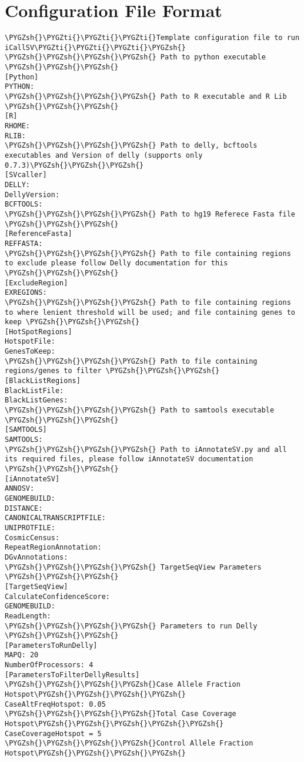 \documentclass[letterpaper,10pt,english]{sphinxmanual}
\def\PYGZsh{\char`\#}
\def\PYGZti{\char`\~}
\begin{document}
\section{Configuration File Format}
\label{iCallSV:configuration-file-format}
\begin{Verbatim}[commandchars=\\\{\}]
\PYGZsh{}\PYGZti{}\PYGZti{}\PYGZti{}Template configuration file to run iCallSV\PYGZti{}\PYGZti{}\PYGZti{}\PYGZsh{}
\PYGZsh{}\PYGZsh{}\PYGZsh{}\PYGZsh{} Path to python executable \PYGZsh{}\PYGZsh{}\PYGZsh{}
[Python]
PYTHON:
\PYGZsh{}\PYGZsh{}\PYGZsh{}\PYGZsh{} Path to R executable and R Lib \PYGZsh{}\PYGZsh{}\PYGZsh{}
[R]
RHOME:
RLIB:
\PYGZsh{}\PYGZsh{}\PYGZsh{}\PYGZsh{} Path to delly, bcftools executables and Version of delly (supports only 0.7.3)\PYGZsh{}\PYGZsh{}\PYGZsh{}
[SVcaller]
DELLY:
DellyVersion:
BCFTOOLS:
\PYGZsh{}\PYGZsh{}\PYGZsh{}\PYGZsh{} Path to hg19 Referece Fasta file \PYGZsh{}\PYGZsh{}\PYGZsh{}
[ReferenceFasta]
REFFASTA:
\PYGZsh{}\PYGZsh{}\PYGZsh{}\PYGZsh{} Path to file containing regions to exclude please follow Delly documentation for this \PYGZsh{}\PYGZsh{}\PYGZsh{}
[ExcludeRegion]
EXREGIONS:
\PYGZsh{}\PYGZsh{}\PYGZsh{}\PYGZsh{} Path to file containing regions to where lenient threshold will be used; and file containing genes to keep \PYGZsh{}\PYGZsh{}\PYGZsh{}
[HotSpotRegions]
HotspotFile:
GenesToKeep:
\PYGZsh{}\PYGZsh{}\PYGZsh{}\PYGZsh{} Path to file containing regions/genes to filter \PYGZsh{}\PYGZsh{}\PYGZsh{}
[BlackListRegions]
BlackListFile:
BlackListGenes:
\PYGZsh{}\PYGZsh{}\PYGZsh{}\PYGZsh{} Path to samtools executable \PYGZsh{}\PYGZsh{}\PYGZsh{}
[SAMTOOLS]
SAMTOOLS:
\PYGZsh{}\PYGZsh{}\PYGZsh{}\PYGZsh{} Path to iAnnotateSV.py and all its required files, please follow iAnnotateSV documentation \PYGZsh{}\PYGZsh{}\PYGZsh{}
[iAnnotateSV]
ANNOSV:
GENOMEBUILD:
DISTANCE:
CANONICALTRANSCRIPTFILE:
UNIPROTFILE:
CosmicCensus:
RepeatRegionAnnotation:
DGvAnnotations:
\PYGZsh{}\PYGZsh{}\PYGZsh{}\PYGZsh{} TargetSeqView Parameters \PYGZsh{}\PYGZsh{}\PYGZsh{}
[TargetSeqView]
CalculateConfidenceScore:
GENOMEBUILD:
ReadLength:
\PYGZsh{}\PYGZsh{}\PYGZsh{}\PYGZsh{} Parameters to run Delly \PYGZsh{}\PYGZsh{}\PYGZsh{}
[ParametersToRunDelly]
MAPQ: 20
NumberOfProcessors: 4
[ParametersToFilterDellyResults]
\PYGZsh{}\PYGZsh{}\PYGZsh{}\PYGZsh{}Case Allele Fraction Hotspot\PYGZsh{}\PYGZsh{}\PYGZsh{}\PYGZsh{}
CaseAltFreqHotspot: 0.05
\PYGZsh{}\PYGZsh{}\PYGZsh{}\PYGZsh{}Total Case Coverage Hotspot\PYGZsh{}\PYGZsh{}\PYGZsh{}\PYGZsh{}\PYGZsh{}
CaseCoverageHotspot = 5
\PYGZsh{}\PYGZsh{}\PYGZsh{}\PYGZsh{}Control Allele Fraction Hotspot\PYGZsh{}\PYGZsh{}\PYGZsh{}\PYGZsh{}

\end{Verbatim}
\end{document}
